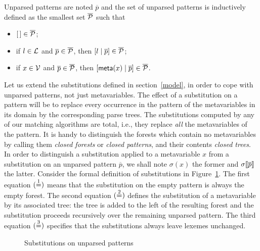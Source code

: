 Unparsed patterns are noted \(\overline{p}\) and the set of unparsed
patterns is inductively defined as the smallest set \(\overline{\cal
  P}\) such that
\begin{itemize}

  \item \([\,] \in \overline{\cal P}\);

  \item if \(l \in {\cal L}\) and \(\overline{p} \in \overline{\cal
    P}\), then \([{l}\mid{\overline{p}}] \in \overline{\cal P}\);

  \item if \(x \in {\cal V}\) and \(\overline{p} \in \overline{\cal
    P}\), then \([{\textsf{meta}(x)}\mid{\overline{p}}] \in \overline{\cal P}\).

\end{itemize}
Let us extend the substitutions defined in section~\ref{model}, in
order to cope with unparsed patterns, not just meta\-variables. The
effect of a substitution on a pattern will be to replace every
occurrence in the pattern of the meta\-variables in its domain by the
corresponding parse trees. The substitutions computed by any of our
matching algorithms are total, i.e., they replace \emph{all} the
meta\-variables of the pattern. It is handy to distinguish the forests
which contain no meta\-variables by calling them \emph{closed forests}
or \emph{closed patterns}, and their contents \emph{closed trees}. In
order to distinguish a substitution applied to a meta\-variable \(x\)
from a substitution on an unparsed pattern \(\overline{p}\), we shall
note \(\sigma(x)\) the former and \({\sigma}\llbracket{\overline{p}}\rrbracket\) the
latter. Consider the formal definition of substitutions in
Figure~\ref{x_subst_def}.  The first equation \((\stackrel{1}{=})\) means that
the substitution on the empty pattern is always the empty forest. The
second equation \((\stackrel{2}{=})\) defines the substitution of a
meta\-variable by its associated tree: the tree is added to the left
of the resulting forest and the substitution proceeds recursively over
the remaining unparsed pattern. The third equation \((\stackrel{3}{=})\)
specifies that the substitutions always leave lexemes unchanged.
\begin{figure}[b]
\caption{Substitutions on unparsed patterns\label{x_subst_def}}
\end{figure}

